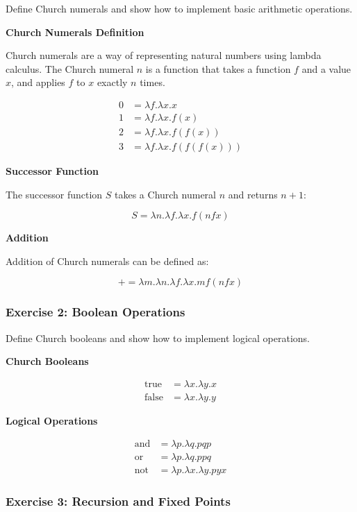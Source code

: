\documentclass{article}
\theoremstyle{plain}
\theoremstyle{definition}
\theoremstyle{remark}
\begin{document}
Define Church numerals and show how to implement basic arithmetic operations.

\textbf{Church Numerals Definition}

Church numerals are a way of representing natural numbers using lambda calculus. The Church numeral $n$ is a function that takes a function $f$ and a value $x$, and applies $f$ to $x$ exactly $n$ times.

\begin{align}
0 &= \lambda f.\lambda x.x \\
1 &= \lambda f.\lambda x.f(x) \\
2 &= \lambda f.\lambda x.f(f(x)) \\
3 &= \lambda f.\lambda x.f(f(f(x)))
\end{align}

\textbf{Successor Function}

The successor function $S$ takes a Church numeral $n$ and returns $n+1$:

$$S = \lambda n.\lambda f.\lambda x.f(n f x)$$

\textbf{Addition}

Addition of Church numerals can be defined as:

$$+ = \lambda m.\lambda n.\lambda f.\lambda x.m f (n f x)$$

\subsubsection{Exercise 2: Boolean Operations}

Define Church booleans and show how to implement logical operations.

\textbf{Church Booleans}

\begin{align}
\text{true} &= \lambda x.\lambda y.x \\
\text{false} &= \lambda x.\lambda y.y
\end{align}

\textbf{Logical Operations}

\begin{align}
\text{and} &= \lambda p.\lambda q.p q p \\
\text{or} &= \lambda p.\lambda q.p p q \\
\text{not} &= \lambda p.\lambda x.\lambda y.p y x
\end{align}

\subsubsection{Exercise 3: Recursion and Fixed Points}
\end{document}
